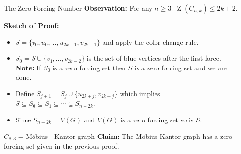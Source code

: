\documentclass[final]{beamer}
\def\red{\color{red}}
\newcommand{\Z}{\operatorname{Z}}
\begin{document}
\begin{frame}{}
\begin{columns}[t]
\begin{column}{0.38\linewidth}
\end{column}%
    
\begin{column}{0.38 \linewidth}

\begin{block}{\red The Zero Forcing Number}
        {\bf Observation:} For any $ n \geq 3 $, $ \Z(C_{n,k}) \leq 2k + 2 $.
        
\textbf{Sketch of Proof:}
\begin{itemize}
\item $S = \{v_0, u_0, \dots, u_{2k-1}, v_{2k-1}\}$ and apply the color change rule.\\
\item $S_0 = S \cup \{v_1, \dots, v_{2k-2}\}$ is the set of blue vertices
after the first force.\\
\textbf{Note:} If $S_0 $ is a zero forcing set then $S$ is a zero forcing set
and we are done.
\item Define $S_{j+1} = S_j \cup \{u_{2k+j},v_{2k+j}\}$ which implies
$S\subseteq S_0 \subseteq S_1 \subseteq \cdots \subseteq S_{n-2k}$. 
\item Since $S_{n-2k} = V(G)$ and $V(G)$ is a zero forcing set so is $S$.
\end{itemize}

\end{block}

\begin{block}{$C_{8,3}$ = M\"{o}bius - Kantor graph}
\textbf{Claim:} The M\"{o}bius-Kantor graph has a zero forcing set given in the previous proof.
\begin{figure}[h!]
\centering
{}
\end{figure}


\end{block}
\end{column}
\end{columns}
\end{frame}
\end{document}
